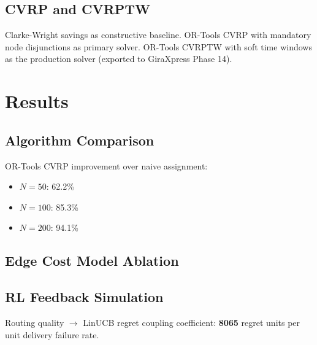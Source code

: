 \documentclass[12pt, a4paper]{article}
\begin{document}
\subsection{CVRP and CVRPTW}
Clarke-Wright savings as constructive baseline. OR-Tools CVRP with mandatory
node disjunctions as primary solver. OR-Tools CVRPTW with soft time windows
as the production solver (exported to GiraXpress Phase 14).

\section{Results}
\label{sec:results}

\subsection{Algorithm Comparison}


OR-Tools CVRP improvement over naive assignment:
\begin{itemize}
  \item $N=50$: 62.2\%
  \item $N=100$: 85.3\%
  \item $N=200$: 94.1\%
\end{itemize}

\subsection{Edge Cost Model Ablation}


\subsection{RL Feedback Simulation}


Routing quality $\to$ LinUCB regret coupling coefficient: \textbf{8065}
regret units per unit delivery failure rate.
\end{document}
